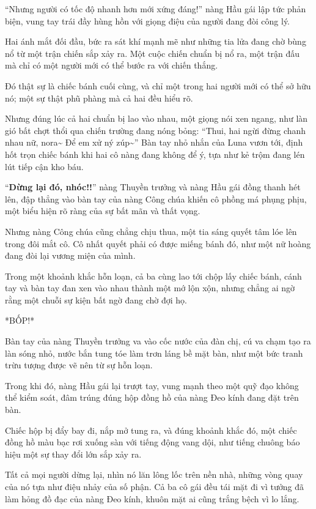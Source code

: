\documentclass[../main.tex]{subfiles}
\begin{document}
``Nhưng người có tốc độ nhanh hơn mới xứng đáng!'' nàng Hầu gái lập tức phản biện, vung tay trái đầy hùng hồn với giọng điệu của người đang đòi công lý.

Hai ánh mắt đối đầu, bức ra sát khí mạnh mẽ như những tia lửa đang chờ bùng nổ từ một trận chiến sắp xảy ra. Một cuộc chiến chuẩn bị nổ ra, một trận đấu mà chỉ có một người mới có thể bước ra với chiến thắng.

Đó thật sự là chiếc bánh cuối cùng, và chỉ một trong hai người mới có thể sở hữu nó; một sự thật phũ phàng mà cả hai đều hiểu rõ.

Nhưng đúng lúc cả hai chuẩn bị lao vào nhau, một giọng nói xen ngang, như làn gió bất chợt thổi qua chiến trường đang nóng bỏng: ``Thui, hai ngừi đừng chanh nhau nữ, nora\~{} Để em xử ný zúp\~{}'' Bàn tay nhỏ nhắn của Luna vươn tới, định hốt trọn chiếc bánh khi hai cô nàng đang không để ý, tựa như kẻ trộm đang lén lút tiếp cận kho báu.

``\textbf{Dừng lại đó, nhóc!!}'' nàng Thuyền trưởng và nàng Hầu gái đồng thanh hét lên, đập thẳng vào bàn tay của nàng Công chúa khiến cô phồng má phụng phịu, một biểu hiện rõ ràng của sự bất mãn và thất vọng.

Nhưng nàng Công chúa cũng chẳng chịu thua, một tia sáng quyết tâm lóe lên trong đôi mắt cô. Cô nhất quyết phải có được miếng bánh đó, như một nữ hoàng đang đòi lại vương miện của mình.

Trong một khoảnh khắc hỗn loạn, cả ba cùng lao tới chộp lấy chiếc bánh, cánh tay và bàn tay đan xen vào nhau thành một mớ lộn xộn, nhưng chẳng ai ngờ rằng một chuỗi sự kiện bất ngờ đang chờ đợi họ.

*BỐP!*

Bàn tay của nàng Thuyền trưởng va vào cốc nước của đàn chị, cú va chạm tạo ra làn sóng nhỏ, nước bắn tung tóe làm trơn láng bề mặt bàn, như một bức tranh trừu tượng được vẽ nên từ sự hỗn loạn.

Trong khi đó, nàng Hầu gái lại trượt tay, vung mạnh theo một quỹ đạo không thể kiểm soát, đâm trúng đúng hộp đồng hồ của nàng Đeo kính đang đặt trên bàn.

Chiếc hộp bị đẩy bay đi, nắp mở tung ra, và đúng khoảnh khắc đó, một chiếc đồng hồ màu bạc rơi xuống sàn với tiếng động vang dội, như tiếng chuông báo hiệu một sự thay đổi lớn sắp xảy ra.

Tất cả mọi người dừng lại, nhìn nó lăn lông lốc trên nền nhà, những vòng quay của nó tựa như điệu nhảy của số phận. Cả ba cô gái đều tái mặt đi vì tưởng đã làm hỏng đồ đạc của nàng Đeo kính, khuôn mặt ai cũng trắng bệch vì lo lắng.
\end{document}
